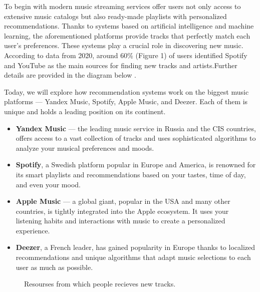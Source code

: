 \documentclass[12pt,a4paper]{article}
\begin{document}
To begin with modern music streaming services offer users not only access to extensive music catalogs but also ready-made playlists with personalized recommendations. Thanks to systems based on artificial intelligence and machine learning, the aforementioned platforms provide tracks that perfectly match each user's preferences. These systems play a crucial role in discovering new music. According to data from 2020, around 60\% (Figure 1) of users identified Spotify and YouTube as the main sources for finding new tracks and artists.Further details are provided in the diagram below \citep{href}\citep{Woman}.

Today, we will explore how recommendation systems work on the biggest music platforms — Yandex Music, Spotify, Apple Music, and Deezer. Each of them is unique and holds a leading position on its continent.

\begin{itemize}
 \item \textbf{Yandex Music} — the leading music service in Russia and the CIS countries, offers access to a vast collection of tracks and uses sophisticated algorithms to analyze your musical preferences and moods.

\item \textbf{Spotify}, a Swedish platform popular in Europe and America, is renowned for its smart playlists and recommendations based on your tastes, time of day, and even your mood.

\item \textbf{Apple Music} — a global giant, popular in the USA and many other countries, is tightly integrated into the Apple ecosystem. It uses your listening habits and interactions with music to create a personalized experience.

\item \textbf{Deezer}, a French leader, has gained popularity in Europe thanks to localized recommendations and unique algorithms that adapt music selections to each user as much as possible.
\end{itemize}

\begin{figure}
\caption{Resourses from which people recieves new tracks\citep{Diagramm}.}
\label{Schema 1}
\end{figure}
\end{document}
